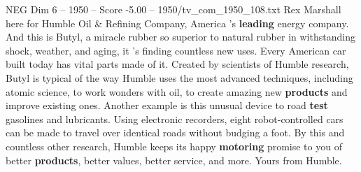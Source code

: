 \begin{textsample}{NEG Dim 6 – 1950 – Score -5.00 – 1950/tv\_com\_1950\_108.txt}  \label{ex:f6_neg_083}
Rex Marshall here for Humble Oil \& Refining Company, America 's \textbf{leading} energy company.
And this is Butyl, a miracle rubber so superior to natural rubber in withstanding shock, weather, and aging, it 's finding countless new uses.
Every American car built today has vital parts made of it.
Created by scientists of Humble research, Butyl is typical of the way Humble uses the most advanced techniques, including atomic science, to work wonders with oil, to create amazing new \textbf{products} and improve existing ones.
Another example is this unusual device to road \textbf{test} gasolines and lubricants.
Using electronic recorders, eight robot-controlled cars can be made to travel over identical roads without budging a foot.
By this and countless other research, Humble keeps its happy \textbf{motoring} promise to you of better \textbf{products}, better values, better service, and more.
Yours from Humble.

\end{textsample}
